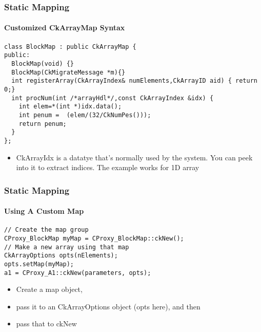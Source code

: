 \begin{frame}[fragile]
  \frametitle{Static Mapping}
  \framesubtitle{Customized CkArrayMap Syntax}
  \begin{lstlisting}
class BlockMap : public CkArrayMap {
public:
  BlockMap(void) {}
  BlockMap(CkMigrateMessage *m){}
  int registerArray(CkArrayIndex& numElements,CkArrayID aid) { return 0;}
  int procNum(int /*arrayHdl*/,const CkArrayIndex &idx) {
    int elem=*(int *)idx.data();
    int penum =  (elem/(32/CkNumPes()));
    return penum;
  }
};
  \end{lstlisting}
  \begin{itemize}
    \item CkArrayIdx is a datatye that’s normally used by the system. You can peek into it to extract indices. The example works for 1D array
  \end{itemize}
\end{frame}

\begin{frame}[fragile]
  \frametitle{Static Mapping}
  \framesubtitle{Using A Custom Map}
  \begin{lstlisting}
// Create the map group
CProxy_BlockMap myMap = CProxy_BlockMap::ckNew();
// Make a new array using that map
CkArrayOptions opts(nElements);
opts.setMap(myMap);
a1 = CProxy_A1::ckNew(parameters, opts);
  \end{lstlisting}
  \begin{itemize}
    \item Create a map object, 
    \item pass it to an CkArrayOptions object (opts here), and then 
    \item pass that to ckNew
  \end{itemize}
\end{frame}
